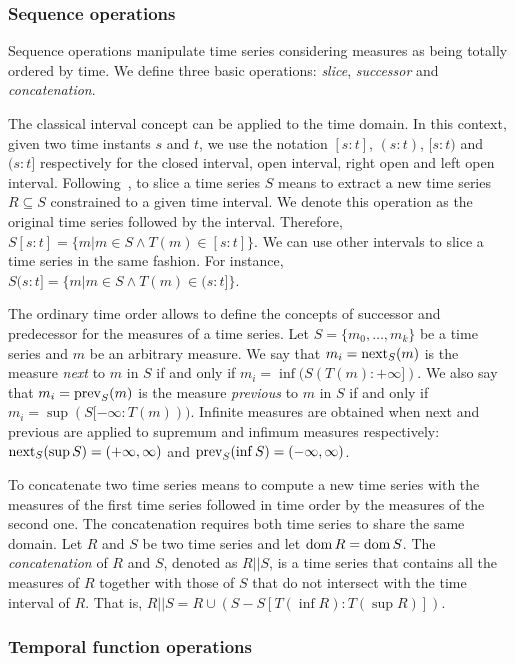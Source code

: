 \subsubsection{Sequence operations}
\label{sec:sequence}

Sequence operations manipulate time series considering measures as
being totally ordered by time.  We define three basic operations:
\emph{slice}, \emph{successor} and \emph{concatenation}.

The classical interval concept can be applied to the time domain. In this
context, given two time instants $s$ and $t$, we use the notation
$[s:t]$, $(s:t)$, $[s:t)$ and $(s:t]$ respectively for the closed
interval, open interval, right open and left open interval.
%
Following~\cite{last:hetland}, to slice a time series $S$ means to
extract a new time series $R\subseteq S$ constrained to a given time
interval. We denote this operation as the original time series followed
by the interval. Therefore, $S[s:t]=\{m|m\in S \wedge
T(m)\in[s:t]\}$. We can use other intervals to slice a time series in
the same fashion. For instance, $S(s:t]=\{m|m\in S \wedge
T(m)\in(s:t]\}$.

The ordinary time order allows to define the concepts of successor and
predecessor for the measures of a time series.
%
Let $S=\{m_0,\ldots,m_k\}$ be a time series and $m$ be an arbitrary
measure.
%
We say that $m_i=\operatorname*{next}_S(m)$ is the measure \emph{next} to $m$ in $S$
if and only if $m_i=\inf(S(T(m):+\infty])$.
%
We also say that $m_i=\operatorname*{prev}_S(m)$ is the measure \emph{previous} to
$m$ in $S$ if and only if $m_i=\sup(S[-\infty:T(m)))$.
%
Infinite measures are obtained when next and previous are applied to
supremum and infimum measures respectively: $\operatorname*{next}_S(\sup
S)=(+\infty,\infty)$ and $\operatorname*{prev}_S(\inf S)=(-\infty,\infty)$.

To concatenate two time series means to compute a new time series with
the measures of the first time series followed in time order by the
measures of the second one. 
%
The concatenation requires both time series to share the same domain.
Let $R$ and $S$ be two time series and let $\operatorname{dom} R=\operatorname{dom} S$. The
\emph{concatenation} of $R$ and $S$, denoted as $R||S$, is a time
series that contains all the measures of $R$ together with those of
$S$ that do not intersect with the time interval of $R$. That is,
$R||S= R\cup (S - S[T(\inf R):T(\sup R)])$.



\subsubsection{Temporal function operations}
\label{sec:model:tfunc}

